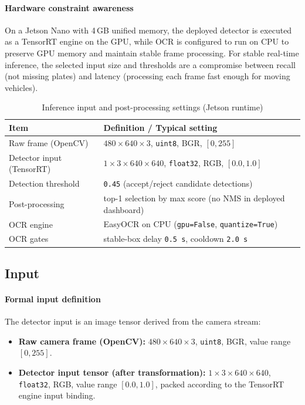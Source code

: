 \paragraph{Hardware constraint awareness}
On a Jetson Nano with 4\,GB unified memory, the deployed detector is executed as a TensorRT engine on the GPU, while OCR is configured to run on CPU to preserve GPU memory and maintain stable frame processing. For stable real-time inference, the selected input size and thresholds are a compromise between recall (not missing plates) and latency (processing each frame fast enough for moving vehicles).

\begin{table}[htbp]
	\centering
	\caption{Inference input and post-processing settings (Jetson runtime)}
	\label{tab:kdd_inference_io}
	\begin{tabular}{@{}ll@{}}
		\toprule
		\textbf{Item} & \textbf{Definition / Typical setting} \\ \midrule
		Raw frame (OpenCV) & \(480\times640\times3\), \texttt{uint8}, BGR, \([0,255]\) \\
		Detector input (TensorRT) & \(1\times3\times640\times640\), \texttt{float32}, RGB, \([0.0,1.0]\) \\
		Detection threshold & \texttt{0.45} (accept/reject candidate detections) \\
		Post-processing & top-1 selection by max score (no NMS in deployed dashboard) \\
		OCR engine & EasyOCR on CPU (\texttt{gpu=False}, \texttt{quantize=True}) \\
		OCR gates & stable-box delay \texttt{0.5 s}, cooldown \texttt{2.0 s} \\ \bottomrule
	\end{tabular}
\end{table}

\subsection{Input}
\label{subsec:kdd_input}

\paragraph{Formal input definition}
The detector input is an image tensor derived from the camera stream:
\begin{itemize}
	\item \textbf{Raw camera frame (OpenCV):} \(480\times640\times3\), \texttt{uint8}, BGR, value range \([0,255]\).
	\item \textbf{Detector input tensor (after transformation):} \(1\times3\times640\times640\), \texttt{float32}, RGB, value range \([0.0,1.0]\), packed according to the TensorRT engine input binding.
\end{itemize}

